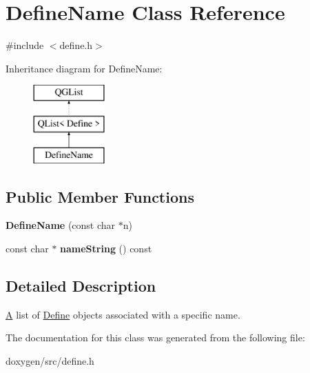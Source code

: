 \hypertarget{class_define_name}{}\section{Define\+Name Class Reference}
\label{class_define_name}


{\ttfamily \#include $<$define.\+h$>$}

Inheritance diagram for Define\+Name\+:\begin{figure}[H]
\begin{center}
\leavevmode
\includegraphics[height=3.000000cm]{class_define_name}
\end{center}
\end{figure}
\subsection*{Public Member Functions}
\begin{DoxyCompactItemize}
\item 
\mbox{\label{class_define_name_a60dd821cc8d7ae696d0dbcd65a841a7f}} 
{\bfseries Define\+Name} (const char $\ast$n)
\item 
\mbox{\label{class_define_name_ae8d3ed790e395c4afb99436a17b457c0}} 
const char $\ast$ {\bfseries name\+String} () const
\end{DoxyCompactItemize}


\subsection{Detailed Description}
\mbox{\hyperlink{class_a}{A}} list of \mbox{\hyperlink{class_define}{Define}} objects associated with a specific name. 

The documentation for this class was generated from the following file\+:\begin{DoxyCompactItemize}
\item 
doxygen/src/define.\+h\end{DoxyCompactItemize}
